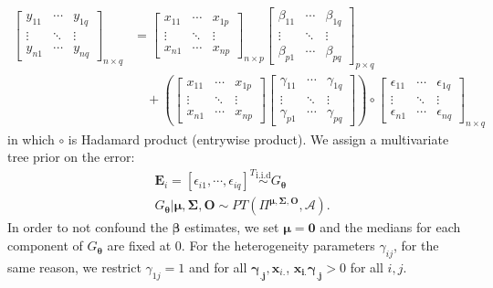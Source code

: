 \begin{align}
  \begin{bmatrix}
    y_{11} &\cdots & y_{1q} \\
    \vdots & \ddots & \vdots \\
    y_{n1} & \cdots & y_{nq}
  \end{bmatrix}_{n\times q} & =
  \begin{bmatrix}
    x_{11} &\cdots & x_{1p} \\
    \vdots & \ddots & \vdots \\
    x_{n1} & \cdots & x_{np}
  \end{bmatrix}_{n\times p}
  \begin{bmatrix}
    \beta_{11} &\cdots & \beta_{1q} \\
    \vdots & \ddots & \vdots \\
    \beta_{p1} & \cdots & \beta_{pq}
  \end{bmatrix}_{p\times q} \nonumber\\
  & \quad + \left( \begin{bmatrix}
      x_{11} &\cdots & x_{1p} \\
      \vdots & \ddots & \vdots \\
      x_{n1} & \cdots & x_{np}
    \end{bmatrix}
    \begin{bmatrix}
      \gamma_{11} &\cdots & \gamma_{1q} \\
      \vdots & \ddots & \vdots \\
      \gamma_{p1} & \cdots & \gamma_{pq}
    \end{bmatrix}
  \right) \circ
  \begin{bmatrix}
    \epsilon_{11} &\cdots & \epsilon_{1q} \\
    \vdots & \ddots & \vdots \\
    \epsilon_{n1} & \cdots & \epsilon_{nq}
  \end{bmatrix}_{n\times q}
\end{align}
in which $\circ$ is Hadamard product (entrywise product). We assign a
multivariate \polya{} tree prior on the error:
\begin{align*}
  &\bm{E}_i = [\epsilon_{i1}, \cdots, \epsilon_{iq}]^T
  \stackrel{\text{i.i.d}}{\sim} G_{\bm{\theta}} \\
  &G_{\bm{\theta}} | \bm{\mu, \Sigma, O} \sim PT \left( \Pi^{\bm{\mu,
        \Sigma, O}}, \mathcal{A} \right).
\end{align*}
In order to not confound the $\bm{\beta}$ estimates, we set $\bm{\mu}
= \bm{0}$ and the medians for each component of $G_{\bm{\theta}}$ are
fixed at 0. For the heterogeneity parameters $\gamma_{ij}$, for the
same reason, we restrict $\gamma_{1j}=1$ and for all
$\bm{\gamma_{.j}}, \bm{x}_{i.}$, $\bm{x_{i.}\gamma_{.j}}>0$ for all
$i,j$.

